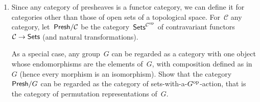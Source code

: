 \documentclass[a4paper,11pt,oneside,openany,article]{memoir}
\begin{document}
\begin{enumerate}
\begin{solution}
    \end{solution}

    Compare the situation in~$\Sets=\SCat/X$ for~$X$ a one-point space, where~$\Omega$ is a two-point set and the classifying map is the characteristic map of a subset.
    
    \begin{solution}
      Now~$t\colon\left\{ 0 \right\}\to\left\{ 0,1 \right\}$, the classifying map is the characteristic function and~$G$ is a subobject of~$F$ if and only if it is a subset of~$F(X)\cong F$. Saying the classifying map is the characteristic function is odd, as the bijection found concerns the characteristic functions from~$F$ to~$\left\{ 0,1 \right\}$, hence \emph{they} define the subsets. The pullback is just the monomorphism.
    \end{solution}

  \item Since any category of presheaves is a functor category, we can define it for categories other than those of open sets of a topological space. For~$\mathcal{C}$ any category, let~$\mathsf{Presh}/\mathcal{C}$ be the category~$\mathsf{Sets}^{\mathcal{C}^{\operatorname{op}}}$ of contravariant functors~$\mathcal{C}\to\mathsf{Sets}$ (and natural transformations).

    As a special case, any group~$G$ can be regarded as a category with one object whose endomorphisms are the elements of~$G$, with composition defined as in~$G$ (hence every morphism is an isomorphism). Show that the category~$\mathsf{Presh}/G$ can be regarded as the category of sets-with-a-$G^{\operatorname{op}}$-action, that is the category of permutation representations of~$G$.


\end{enumerate}
\end{document}
